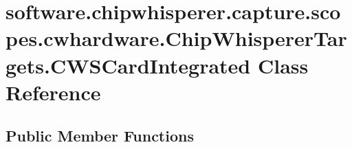 \hypertarget{classsoftware_1_1chipwhisperer_1_1capture_1_1scopes_1_1cwhardware_1_1ChipWhispererTargets_1_1CWSCardIntegrated}{}\section{software.\+chipwhisperer.\+capture.\+scopes.\+cwhardware.\+Chip\+Whisperer\+Targets.\+C\+W\+S\+Card\+Integrated Class Reference}
\label{classsoftware_1_1chipwhisperer_1_1capture_1_1scopes_1_1cwhardware_1_1ChipWhispererTargets_1_1CWSCardIntegrated}
\subsection*{Public Member Functions}
